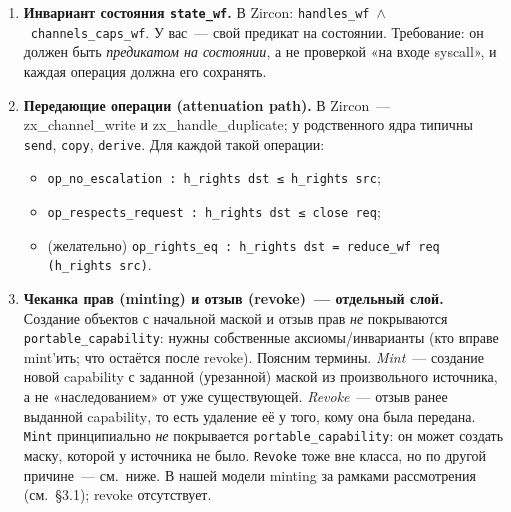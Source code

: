\documentclass[11pt,a4paper]{article}
\newcommand{\isabel}[1]{{\isabelleit #1}}
\newcommand{\lemmaname}[1]{\isabel{#1}}
\begin{document}
\begin{enumerate}[leftmargin=1.4em]
	      полноты: всякая неподвижная точка замыкания~--- уже wf-маска.
	\item \textbf{Инвариант состояния \texttt{state\_wf}.}
	      В Zircon: \texttt{handles\_wf}~$\wedge$~\texttt{channels\_caps\_wf}.
	      У вас~--- свой предикат на состоянии. Требование: он должен быть
	      \emph{предикатом на состоянии}, а не проверкой «на входе syscall»,
	      и каждая операция должна его сохранять.
	\item \textbf{Передающие операции (attenuation path).}
	      В Zircon~--- \lemmaname{zx\_channel\_write} и
	      \lemmaname{zx\_handle\_duplicate}; у родственного ядра типичны
	      \texttt{send}, \texttt{copy}, \texttt{derive}. Для каждой такой
	      операции:
	      \begin{itemize}[leftmargin=1.4em]
		      \item \texttt{op\_no\_escalation : h\_rights dst ≤ h\_rights src};
		      \item \texttt{op\_respects\_request : h\_rights dst ≤ close req};
		      \item (желательно) \texttt{op\_rights\_eq :
			            h\_rights dst = reduce\_wf req (h\_rights src)}.
	      \end{itemize}
	\item \textbf{Чеканка прав (minting) и отзыв (revoke)~--- отдельный
		      слой.}
	      Создание объектов с начальной маской и отзыв прав
	      \emph{не} покрываются \texttt{portable\_capability}: нужны
	      собственные аксиомы/инварианты (кто вправе mint'ить; что
	      остаётся после revoke).
	      Поясним термины. \emph{Mint}~--- создание новой
	      \textenglish{capability} с заданной (урезанной) маской из
	      произвольного источника, а не «наследованием» от уже
	      существующей. \emph{Revoke}~--- отзыв ранее выданной
	      \textenglish{capability}, то есть удаление её у того, кому она
	      была передана. \texttt{Mint} принципиально \emph{не}
	      покрывается \texttt{portable\_capability}: он может создать
	      маску, которой у источника не было.
	      \texttt{Revoke} тоже вне класса, но по другой причине~--- см.~ниже.
	      В нашей модели minting за рамками рассмотрения (см.~§3.1); revoke отсутствует.


\end{enumerate}
\end{document}

